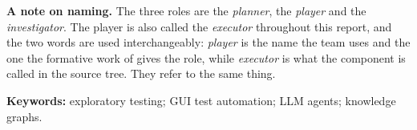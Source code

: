 \vspace{6pt}
\noindent\textbf{A note on naming.} The three roles are the
\emph{planner}, the \emph{player} and the \emph{investigator}. The player is
also called the \emph{executor} throughout this report, and the two words are
used interchangeably: \emph{player} is the name the team uses and the one the
formative work of  gives the role, while \emph{executor}
is what the component is called in the source tree. They refer to the same
thing.

\vspace{0pt}
\noindent\textbf{Keywords:} exploratory testing; GUI test automation; LLM agents; knowledge graphs.
\clearpage

